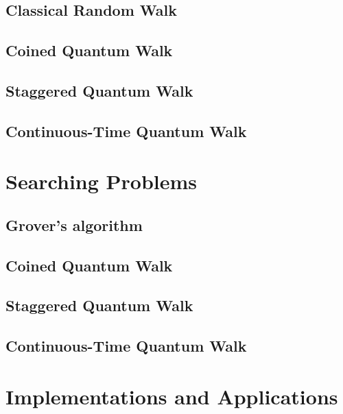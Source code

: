 \documentclass[
oneside,
11pt, a4paper,
footinclude=true,
headinclude=true,
cleardoublepage=empty
]{scrbook}
\begin{document}
\section{Classical Random Walk}\label{sec:chap3ClassicalWalk}

\section{Coined Quantum Walk}\label{sec:chap3Coinedwalk}

\section{Staggered Quantum Walk}\label{sec:chap3StagWalk}

\section{Continuous-Time Quantum Walk}\label{sec:chap3Contwalk}



\chapter{Searching Problems}\label{chap:searchingProblems}

\section{Grover's algorithm}\label{sec:GrovSearchSimul}

\section{Coined Quantum Walk}\label{sec:CoinedSearchSimul}

\section{Staggered Quantum Walk}\label{sec:StagSearchSimul}

\section{Continuous-Time Quantum Walk}\label{sec:ContSearchSimul}



\chapter{Implementations and Applications}\label{chap:qiskitImplementation}

\end{document}
